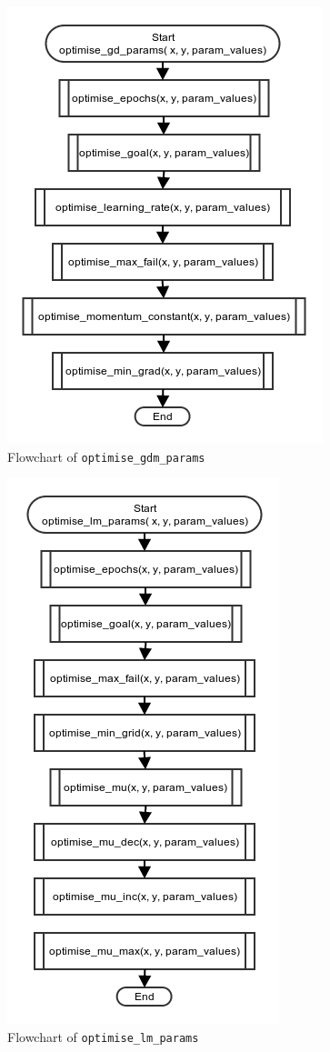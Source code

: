 \documentclass[10pt,a4paper]{article}
\begin{document}
\begin{figure}[!ht]
	\centering
	\includegraphics[scale=0.7]{images/flow_chart/optimise_gdm_params.png}
	\caption{Flowchart of \tt{optimise\_gdm\_params}}
	\label{fig:optimise_gdm_params}
\end{figure}

\begin{figure}[!ht]
	\centering
	\includegraphics[scale=0.7]{images/flow_chart/optimise_lm_params.png}
	\caption{Flowchart of \tt{optimise\_lm\_params}}
	\label{fig:optimise_lm_params}
\end{figure}
\end{document}
